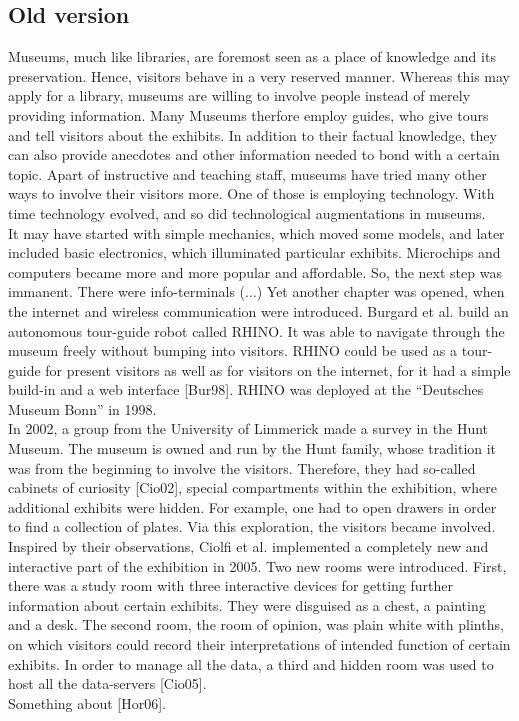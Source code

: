 \subsection*{Old version}

Museums, much like libraries, are foremost seen as a place of knowledge and its preservation. Hence, visitors behave in a very reserved manner. Whereas this may apply for a library, museums are willing to involve people instead of merely providing information. Many Museums therfore employ guides, who give tours and tell visitors about the exhibits. In addition to their factual knowledge, they can also provide anecdotes and other information needed to bond with a certain topic. Apart of instructive and teaching staff, museums have tried many other ways to involve their visitors more. One of those is employing technology. With time technology evolved, and so did technological augmentations in museums.
\\
It may have started with simple mechanics, which moved some models, and later included basic electronics, which illuminated particular exhibits. Microchips and computers became more and more popular and affordable. So, the next step was immanent. There were info-terminals (...) Yet another chapter was opened, when the internet and wireless communication were introduced. Burgard et al. build an autonomous tour-guide robot called RHINO. It was able to navigate through the museum freely without bumping into visitors. RHINO could be used as a tour-guide for present visitors as well as for visitors on the internet, for it had a simple build-in and a web interface [Bur98]. RHINO was deployed at the “Deutsches Museum Bonn” in 1998.
\\
In 2002, a group from the University of Limmerick made a survey in the Hunt Museum. The
museum is owned and run by the Hunt family, whose tradition it was from the beginning to involve the visitors. Therefore, they had so-called cabinets of curiosity [Cio02], special compartments within the exhibition, where additional exhibits were hidden. For example, one had to open drawers in order to find a collection of plates. Via this exploration, the visitors became involved. Inspired by their observations, Ciolfi et al. implemented a completely new and interactive part of the exhibition in 2005. Two new rooms were  introduced. First, there was a study room with three interactive devices for getting further information about certain exhibits. They were disguised as a chest, a painting and a desk. The second room, the room of opinion, was plain white with plinths, on which visitors could record their interpretations of intended function of certain exhibits. In  order to manage all the data, a third and hidden room was used to host all the data-servers [Cio05].
\\
Something about [Hor06].

